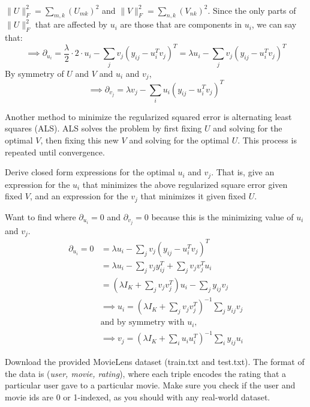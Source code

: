 \begin{solution}
	\\ $\|U\|_F^2 = \sum_{m,k} (U_{mk})^2$ and $\|V\|_F^2 = \sum_{n,k} (V_{nk})^2$. Since the only parts of $\|U\|_F^2$ that are affected by $u_i$ are those that are components in $u_i$, we can say that:
	$$\implies \partial_{u_i} = \frac{\lambda}{2} \cdot 2 \cdot u_{i} - \sum_{j} v_{j}(y_{ij} - u_{i}^T v_{j})^T = \lambda{u_{i}} - \sum_{j} v_{j}(y_{ij} - u_{i}^T v_{j})^T$$
	By symmetry of $U$ and $V$ and $u_i$ and $v_j$,
	$$\implies \partial_{v_j} = \lambda{v_{j}} - \sum_{i} u_i(y_{ij} - u_{i}^T v_{j})^T$$
\end{solution}

\problem[5]Another method to minimize the regularized squared error is alternating least squares (ALS). ALS solves the problem by first fixing $U$ and solving for the optimal $V$, then fixing this new $V$ and solving for the optimal $U$.  This process is repeated until convergence.

Derive closed form expressions for the optimal $u_i$ and $v_j$.  That is, give an expression for the $u_i$ that minimizes the above regularized square error given fixed $V$, and an expression for the $v_j$ that minimizes it given fixed $U$.

\begin{solution}
	Want to find where $\partial_{u_{i}} = 0$ and $\partial_{v_{j}} = 0$ because this is the minimizing value of $u_{i}$ and $v_{j}$.
	\begin{align*}
	\partial_{u_{i}} = 0 &= \lambda{u_{i}} - \sum_{j} v_{j}(y_{ij} - u_{i}^T v_{j})^T \\
	&= \lambda{u_{i}} - \sum_{j} v_{j}y_{ij}^T + \sum_{j} v_{j}v_{j}^{T}u_{i} \\
	&= (\lambda I_K + \sum_{j} v_{j}v_{j}^T)u_{i} - \sum_{j} y_{ij}v_{j} \\
	&\implies u_{i} = (\lambda I_K + \sum_{j} v_{j}v_{j}^T)^{-1}\sum_{j}y_{ij}v_{j} \\ &\text{and by symmetry with $u_{i}$,} \\
	&\implies v_{j} = (\lambda I_K + \sum_{i} u_{i}u_{i}^T)^{-1}\sum_{i}y_{ij}u_{i} 
	\end{align*}
\end{solution}

\problem[10]Download the provided MovieLens dataset (train.txt and test.txt).  The format of the data is (\emph{user, movie, rating}), where each triple encodes the rating that a particular user gave to a particular movie. Make sure you check if the user and movie ids are 0 or 1-indexed, as you should with any real-world dataset.

